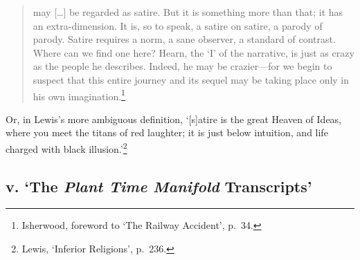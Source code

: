 \documentclass[]{article}
\begin{document}
\begin{quote}
\singlespacing may {[}\ldots{}{]} be regarded as satire. But it is
something more than that; it has an extra-dimension. It is, so to speak,
a satire on satire, a parody of parody. Satire requires a norm, a sane
observer, a standard of contrast. Where can we find one here? Hearn, the
‘I’ of the narrative, is just as crazy as the people he describes.
Indeed, he may be crazier—for we begin to suspect that this entire
journey and its sequel may be taking place only in his own
imagination.\footnote{Isherwood, foreword to ‘The Railway Accident’,
  p.~34.}
\end{quote}

\noindent Or, in Lewis’s more ambiguous definition, ‘{[}s{]}atire is the
great Heaven of Ideas, where you meet the titans of red laughter; it is
just below intuition, and life charged with black illusion.’\footnote{Lewis,
  ‘Inferior Religions’, p.~236.}

\subsection{\texorpdfstring{v. ‘The \emph{Plant Time Manifold}
Transcripts’}{v. ‘The Plant Time Manifold Transcripts’}}\label{v.-the-plant-time-manifold-transcripts}
\end{document}
